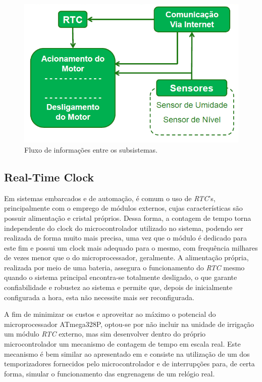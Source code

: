 \documentclass[conference]{IEEEtran}
\begin{document}
\begin{figure}[htbp]
\centerline{\includegraphics[angle=0, scale=.3]{Img2.png}}
\caption{Fluxo de informações entre os subsistemas.}
\label{fig2}
\end{figure}

\subsection{Real-Time Clock}

Em sistemas embarcados e de automação, é comum o uso de \textit{RTC}’s, principalmente com o emprego de módulos externos, cujas características são possuir alimentação e cristal próprios. Dessa forma, a contagem de tempo torna independente do clock do microcontrolador utilizado no sistema, podendo ser realizada de forma muito mais precisa, uma vez que o módulo é dedicado para este fim e possui um clock mais adequado para o mesmo, com frequência milhares de vezes menor que o do microprocessador, geralmente. A alimentação própria, realizada por meio de uma bateria, assegura o funcionamento do \textit{RTC} mesmo quando o sistema principal encontra-se totalmente desligado, o que garante confiabilidade e robustez ao sistema e permite que, depois de inicialmente configurada a hora, esta não necessite mais ser reconfigurada.

A fim de minimizar os custos e aproveitar ao máximo o potencial do microprocessador ATmega328P, optou-se por não incluir na unidade de irrigação um módulo \textit{RTC} externo, mas sim desenvolver dentro do próprio microcontrolador um mecanismo de contagem de tempo em escala real. Este mecanismo é bem similar ao apresentado em \cite{b1} e consiste na utilização de um dos temporizadores fornecidos pelo microcontrolador e de interrupções para, de certa forma, simular o funcionamento das engrenagens de um relógio real.
\end{document}
